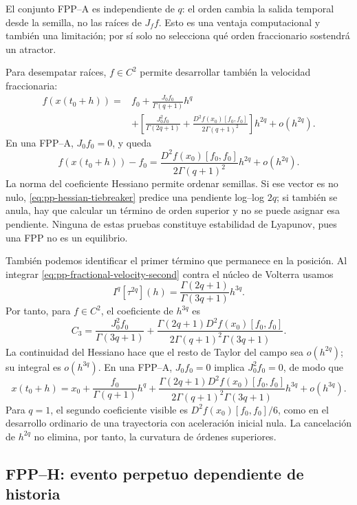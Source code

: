 El conjunto FPP--A es independiente de \(q\): el orden cambia la salida
temporal desde la semilla, no las raíces de \(J_f f\). Esto es una ventaja
computacional y también una limitación; por sí solo no selecciona qué orden
fraccionario sostendrá un atractor.

Para desempatar raíces, \(f\in C^2\) permite desarrollar también la velocidad
fraccionaria:
\begin{align}
 f(x(t_0+h))
 ={}&f_0+\frac{J_0 f_0}{\Gamma(q+1)}h^q\\
 &+\left[
 \frac{J_0^2f_0}{\Gamma(2q+1)}
 +\frac{D^2f(x_0)[f_0,f_0]}{2\Gamma(q+1)^2}
 \right]h^{2q}+o(h^{2q}).
 \label{eq:pp-fractional-velocity-second}
\end{align}
En una FPP--A, \(J_0 f_0=0\), y queda
\begin{equation}
 f(x(t_0+h))-f_0
 =\frac{D^2f(x_0)[f_0,f_0]}{2\Gamma(q+1)^2}h^{2q}
 +o(h^{2q}).
 \label{eq:pp-hessian-tiebreaker}
\end{equation}
La norma del coeficiente Hessiano permite ordenar semillas. Si ese vector
es no nulo, \cref{eq:pp-hessian-tiebreaker} predice una pendiente log--log
\(2q\); si también se anula, hay que calcular un término de orden superior
y no se puede asignar esa pendiente. Ninguna de estas pruebas constituye
estabilidad de Lyapunov, pues una FPP no es un equilibrio.

También podemos identificar el primer término que permanece en la posición.
Al integrar \cref{eq:pp-fractional-velocity-second} contra el núcleo de
Volterra usamos
\[
 I^q[\tau^{2q}](h)
 =\frac{\Gamma(2q+1)}{\Gamma(3q+1)}h^{3q}.
\]
Por tanto, para \(f\in C^2\), el coeficiente de \(h^{3q}\) es
\begin{equation}
 C_3=
 \frac{J_0^2f_0}{\Gamma(3q+1)}+
 \frac{\Gamma(2q+1)D^2f(x_0)[f_0,f_0]}
 {2\Gamma(q+1)^2\Gamma(3q+1)}.
 \label{eq:pp-picard-tercer-coeficiente}
\end{equation}
La continuidad del Hessiano hace que el resto de Taylor del campo sea
\(o(h^{2q})\); su integral es \(o(h^{3q})\). En una FPP--A,
\(J_0f_0=0\) implica \(J_0^2f_0=0\), de modo que
\[
 x(t_0+h)=x_0+\frac{f_0}{\Gamma(q+1)}h^q+
 \frac{\Gamma(2q+1)D^2f(x_0)[f_0,f_0]}
 {2\Gamma(q+1)^2\Gamma(3q+1)}h^{3q}+o(h^{3q}).
\]
Para \(q=1\), el segundo coeficiente visible es
\(D^2f(x_0)[f_0,f_0]/6\), como en el desarrollo ordinario de una
trayectoria con aceleración inicial nula. La cancelación de \(h^{2q}\)
no elimina, por tanto, la curvatura de órdenes superiores.

\subsection{FPP--H: evento perpetuo dependiente de historia}

